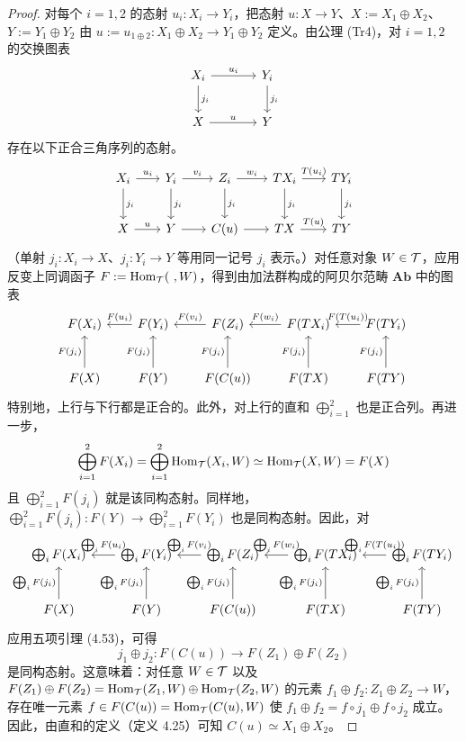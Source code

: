 \begin{proof}
对每个 $i=1,2$ 的态射 $u_i\colon X_i\to Y_i$，把态射 $u\colon X\to Y$、$X := X_1\oplus X_2$、$Y := Y_1\oplus Y_2$ 由 $u := u_{1\oplus 2}\colon X_1\oplus X_2\to Y_1\oplus Y_2$ 定义。由公理 (Tr4)，对 $i=1,2$ 的交换图表
\[
\begin{tikzcd}[row sep=2.2em, column sep=3.6em]
X_i \arrow[r,"u_i"] \arrow[d,"j_i"] & Y_i \arrow[d,"j_i"] \\
X \arrow[r,"u"] & Y
\end{tikzcd}
\]
存在以下正合三角序列的态射。
\[
\begin{tikzcd}[row sep=2.4em, column sep=1.9em]
X_i \arrow[r,"u_i"] \arrow[d,"j_i"] & Y_i \arrow[r,"v_i"] \arrow[d,"j_i"] & Z_i \arrow[r,"w_i"] \arrow[d,"j_i"] & TX_i \arrow[r,"T(u_i)"] \arrow[d,"j_i"] & TY_i \arrow[d,"j_i"] \\
X \arrow[r,"u"] & Y \arrow[r] & C(u) \arrow[r] & TX \arrow[r,"T(u)"] & TY
\end{tikzcd}
\]
（单射 $j_i\colon X_i\to X$、$j_i\colon Y_i\to Y$ 等用同一记号 $j_i$ 表示。）对任意对象 $W\in\mathcal{T}$，应用反变上同调函子 $F := \Hom_{\cT}(\ ,W)$，得到由加法群构成的阿贝尔范畴 $\mathbf{Ab}$ 中的图表
\[
\begin{tikzcd}[row sep=2.6em, column sep=2.0em]
F(X_i) & F(Y_i) \arrow[l,"F(u_i)"'] & F(Z_i) \arrow[l,"F(v_i)"'] & F(TX_i) \arrow[l,"F(w_i)"'] & F(TY_i) \arrow[l,"F(T(u_i))"'] \\
F(X) \arrow[u,"F(j_i)"] & F(Y) \arrow[u,"F(j_i)"] & F(C(u)) \arrow[u,"F(j_i)"] & F(TX) \arrow[u,"F(j_i)"] & F(TY) \arrow[u,"F(j_i)"]
\end{tikzcd}
\]
特别地，上行与下行都是正合的。此外，对上行的直和 $\bigoplus_{i=1}^2$ 也是正合列。再进一步，
\[
\bigoplus_{i=1}^2 F(X_i)=\bigoplus_{i=1}^2\operatorname{Hom}_{\mathcal{T}}(X_i,W)\simeq\operatorname{Hom}_{\mathcal{T}}(X,W)=F(X)
\]
且 $\bigoplus_{i=1}^2 F(j_i)$ 就是该同构态射。同样地，$\bigoplus_{i=1}^2 F(j_i)\colon F(Y)\to\bigoplus_{i=1}^2 F(Y_i)$ 也是同构态射。因此，对
\[
\begin{tikzcd}[row sep=2.6em, column sep=1.9em]
\bigoplus_i F(X_i) & \bigoplus_i F(Y_i) \arrow[l,"\bigoplus_i F(u_i)"'] & \bigoplus_i F(Z_i) \arrow[l,"\bigoplus_i F(v_i)"'] & \bigoplus_i F(TX_i) \arrow[l,"\bigoplus_i F(w_i)"'] & \bigoplus_i F(TY_i) \arrow[l,"\bigoplus_i F(T(u_i))"'] \\
F(X) \arrow[u,"\bigoplus_i F(j_i)"] & F(Y) \arrow[u,"\bigoplus_i F(j_i)"] & F(C(u)) \arrow[u,"\bigoplus_i F(j_i)"] & F(TX) \arrow[u,"\bigoplus_i F(j_i)"] & F(TY) \arrow[u,"\bigoplus_i F(j_i)"]
\end{tikzcd}
\]
应用五项引理 (4.53)，可得
\[
j_1\oplus j_2 \colon F(C(u))\longrightarrow F(Z_1)\oplus F(Z_2)
\]
是同构态射。这意味着：对任意 $W\in\mathcal{T}$ 以及 $F(Z_1)\oplus F(Z_2)=\operatorname{Hom}_{\mathcal{T}}(Z_1,W)\oplus\operatorname{Hom}_{\mathcal{T}}(Z_2,W)$ 的元素 $f_1\oplus f_2\colon Z_1\oplus Z_2\to W$，存在唯一元素 $f\in F(C(u))=\operatorname{Hom}_{\mathcal{T}}(C(u),W)$ 使 $f_1\oplus f_2=f\circ j_1\oplus f\circ j_2$ 成立。因此，由直和的定义（定义 4.25）可知 $C(u)\simeq X_1\oplus X_2$。
\end{proof}

